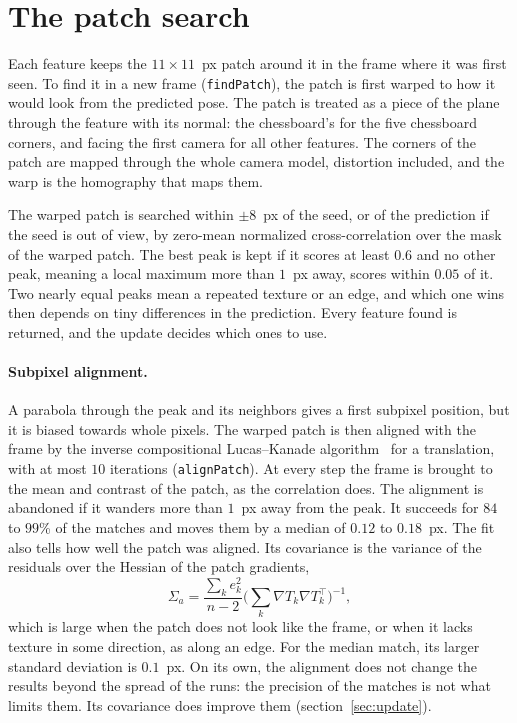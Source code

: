 \documentclass[11pt]{article}
\begin{document}
\section{The patch search}
\label{sec:search}

Each feature keeps the $11 \times 11$~px patch around it in the frame where it was first seen. To
find it in a new frame (\texttt{findPatch}), the patch is first warped to how it would look from
the predicted pose. The patch is treated as a piece of the plane through the feature with its
normal: the chessboard's for the five chessboard corners, and facing the first camera for all other
features. The corners of the patch are mapped through the whole camera model, distortion included,
and the warp is the homography that maps them.

The warped patch is searched within $\pm 8$~px of the seed, or of the prediction if the seed is out
of view, by zero-mean normalized cross-correlation over the mask of the warped patch. The best peak
is kept if it scores at least $0.6$ and no other peak, meaning a local maximum more than $1$~px
away, scores within $0.05$ of it. Two nearly equal peaks mean a repeated texture or an edge, and
which one wins then depends on tiny differences in the prediction. Every feature found is returned,
and the update decides which ones to use.

\paragraph{Subpixel alignment.}
A parabola through the peak and its neighbors gives a first subpixel position, but it is biased
towards whole pixels. The warped patch is then aligned with the frame by the inverse compositional
Lucas--Kanade algorithm~\cite{baker2004} for a translation, with at most $10$ iterations
(\texttt{alignPatch}). At every step the frame is brought to the mean and contrast of the patch, as
the correlation does. The alignment is abandoned if it wanders more than $1$~px away from the peak.
It succeeds for $84$ to $99$\% of the matches and moves them by a median of $0.12$ to $0.18$~px.
The fit also tells how well the patch was aligned. Its covariance is the variance of the residuals
over the Hessian of the patch gradients,
\begin{equation}
  \Sigma_a = \frac{\sum_k e_k^2}{n - 2} \Big(\sum_k \nabla T_k \nabla T_k^\top\Big)^{-1},
\end{equation}
which is large when the patch does not look like the frame, or when it lacks texture in some
direction, as along an edge. For the median match, its larger standard deviation is $0.1$~px. On
its own, the alignment does not change the results beyond the spread of the runs: the precision of
the matches is not what limits them. Its covariance does improve them (section~\ref{sec:update}).
\end{document}
